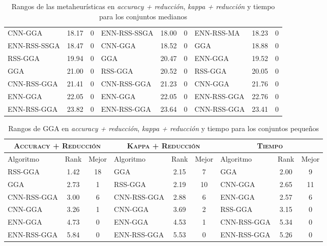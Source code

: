 \begin{table}[h!]
\begin{adjustbox}{max width =\textwidth}
\begin{tabular}{l c c|l c c|l c c}
CNN-GGA      & 18.17 & 0 & ENN-RSS-SSGA & 18.00 & 0  &  ENN-RSS-MA   & 18.23 & 0 \\
ENN-RSS-SSGA & 18.47 & 0 & CNN-GGA      & 18.52 & 0  &  GGA          & 18.88 & 0 \\
RSS-GGA      & 19.94 & 0 & GGA          & 20.47 & 0  &  ENN-GGA      & 19.52 & 0 \\
GGA          & 21.00 & 0 & RSS-GGA      & 20.52 & 0  &  RSS-GGA      & 20.05 & 0 \\
CNN-RSS-GGA  & 21.41 & 0 & CNN-RSS-GGA  & 21.23 & 0  &  CNN-GGA      & 21.76 & 0 \\
ENN-GGA      & 22.05 & 0 & ENN-GGA      & 22.05 & 0  &  ENN-RSS-GGA  & 22.76 & 0 \\
ENN-RSS-GGA  & 23.82 & 0 & ENN-RSS-GGA  & 23.64 & 0  &  CNN-RSS-GGA  & 23.41 & 0 \\ 

\hline
\end{tabular}
\end{adjustbox}
\caption{Rangos de las metaheurísticas en \emph{accuracy + reducción}, \emph{kappa + reducción} y tiempo para los conjuntos medianos}
\label{rank-med}
\end{table}



\begin{table}[h!]
\centering
\begin{adjustbox}{max width =\textwidth}
\begin{tabular}{l c c|l c c|l c c}
\hline
\multicolumn{3}{c|}{\textsc{Accuracy + Reducción}}
	& \multicolumn{3}{c|}{\textsc{Kappa + Reducción}}
	& \multicolumn{3}{c}{\textsc{Tiempo}} \\
\hline
Algoritmo & Rank & Mejor & Algoritmo & Rank & Mejor & Algoritmo & Rank & Mejor \\
\hline
\hline

RSS-GGA     & 1.42 & 18 & GGA         & 2.15 & 7  & GGA         & 2.00 & 9  \\
GGA         & 2.73 & 1  & RSS-GGA     & 2.19 & 10 & CNN-GGA     & 2.65 & 11 \\
CNN-RSS-GGA & 3.00 & 6  & CNN-RSS-GGA & 2.88 & 6  & ENN-GGA     & 2.57 & 6  \\
CNN-GGA     & 3.26 & 1  & CNN-GGA     & 3.69 & 2  & RSS-GGA     & 3.15 & 0  \\
ENN-GGA     & 4.73 & 0  & ENN-GGA     & 4.53 & 1  & CNN-RSS-GGA & 5.34 & 0  \\
ENN-RSS-GGA & 5.84 & 0  & ENN-RSS-GGA & 5.53 & 0  & ENN-RSS-GGA & 5.26 & 0  \\


\hline
\end{tabular}
\end{adjustbox}
\caption{Rangos de GGA en \emph{accuracy + reducción}, \emph{kappa + reducción} y tiempo para los conjuntos pequeños}
\label{rank-gga-peq}
\end{table} 


